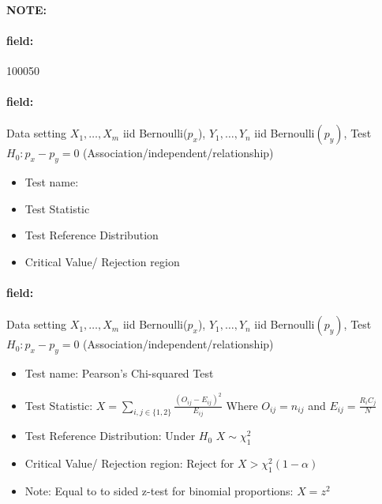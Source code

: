 \documentclass[12pt]{article}
\newenvironment{note}{\paragraph{NOTE:}}{}
\newenvironment{field}{\paragraph{field:}}{}
\begin{document}
\begin{note} \begin{field} \tiny 100050 \end{field}
 \begin{field}
  Data setting $X_1, \ldots , X_m$ iid Bernoulli($p_x$), $Y_1, \ldots, Y_n$ iid Bernoulli$(p_y)$, Test $H_0: p_x - p_y = 0$ (Association/independent/relationship)
  \begin{itemize}
   \item Test name:
   \item Test Statistic
   \item Test Reference Distribution
   \item Critical Value/ Rejection region
  \end{itemize}
 \end{field}
 \begin{field}
  Data setting $X_1, \ldots , X_m$ iid Bernoulli($p_x$), $Y_1, \ldots, Y_n$ iid Bernoulli$(p_y)$, Test $H_0: p_x - p_y = 0$ (Association/independent/relationship)
  \begin{itemize}
   \item Test name: Pearson's Chi-squared Test
   \item Test Statistic: $X = \sum_{i,j \in \{1,2\}} \frac{(O_{ij} - E_{ij})^2}{E_{ij}}$ Where $O_{ij} = n_{ij}$ and $E_{ij} = \frac{R_iC_j}{N}$
   \item Test Reference Distribution: Under $H_0$ $X \sim \chi^2_1$
   \item Critical Value/ Rejection region: Reject for $X > \chi_1^2(1 - \alpha)$
   \item Note: Equal to to sided z-test for binomial proportions: $X = z^2$
  \end{itemize}
 \end{field}
\end{note}
\end{document}
